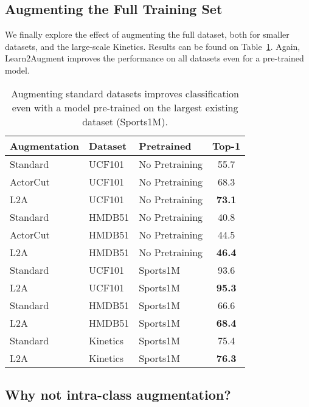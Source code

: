 \documentclass[runningheads]{llncs}
\newcommand{\Method}{Learn2Augment\xspace}
\newcommand{\MethodShort}{L2A\xspace}
\begin{document}
\subsection{Augmenting the Full Training Set}

We finally explore the effect of augmenting the full dataset, both for smaller datasets, and the large-scale Kinetics. 
Results can be found on Table~\ref{table:fullset}. Again, \Method improves the performance on all datasets even for a pre-trained model. 

\begin{table}[t]
\centering

\begin{tabular}{l l l c}
Augmentation & Dataset & Pretrained & Top-1 \\
\hline 
Standard & UCF101 & No Pretraining & 55.7 \\
ActorCut \cite{actorcut} & UCF101 & No Pretraining & 68.3 \\
\MethodShort & UCF101 & No Pretraining & {\bf 73.1} \\
\hline 
Standard & HMDB51 & No Pretraining & 40.8 \\
ActorCut \cite{actorcut} & HMDB51 & No Pretraining & 44.5 \\
\MethodShort & HMDB51 & No
Pretraining & {\bf 46.4} \\
\hline 
Standard & UCF101 & Sports1M &  93.6 \\
\MethodShort & UCF101 & Sports1M & {\bf 95.3} \\
\hline 
Standard & HMDB51 & Sports1M & 66.6 \\
\MethodShort & HMDB51 & Sports1M &  {\bf 68.4} \\
\hline
Standard & Kinetics & Sports1M & 75.4 \\
\MethodShort & Kinetics & Sports1M &  {\bf 76.3}\\
\end{tabular}
\caption{Augmenting standard datasets improves classification even with a model pre-trained on the largest existing dataset (Sports1M). }
\label{table:fullset}
\vspace{-0.5cm}
\end{table}












\iffalse
\subsection{Why not intra-class augmentation?}
\end{document}
